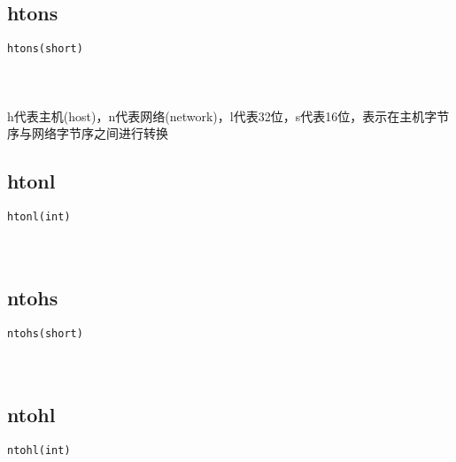 \documentclass[10pt,a4paper]{article}
\begin{document}
\subsection{htons}
\begin{spacing}{2.0}
\lstset{language=C,numbers=none}
\begin{lstlisting}
htons(short)
\end{lstlisting}
{\large\color[rgb]{0.2,0.4,0.6}{short:}}
\paragraph{ \ \ }h代表主机(host)，n代表网络(network)，l代表32位，s代表16位，表示在主机字节序与网络字节序之间进行转换
\end{spacing}

\subsection{htonl}
\begin{spacing}{2.0}
\lstset{language=C,numbers=none}
\begin{lstlisting}
htonl(int)
\end{lstlisting}
{\large\color[rgb]{0.2,0.4,0.6}{int:}}
\paragraph{ \ \ }
\end{spacing}

\subsection{ntohs}
\begin{spacing}{2.0}
\lstset{language=C,numbers=none}
\begin{lstlisting}
ntohs(short)
\end{lstlisting}
{\large\color[rgb]{0.2,0.4,0.6}{short:}}
\paragraph{ \ \ }
\end{spacing}

\subsection{ntohl}
\begin{spacing}{2.0}
\lstset{language=C,numbers=none}
\begin{lstlisting}
ntohl(int)
\end{lstlisting}
{\large\color[rgb]{0.2,0.4,0.6}{int:}}
\paragraph{ \ \ }
\end{spacing}
\end{document}
